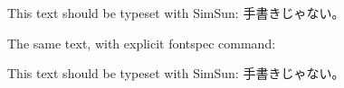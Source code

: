 \documentclass{article}
\begin{document}
This text should be typeset with SimSun: 手書きじゃない。

The same text, with explicit fontspec command:

This text should be typeset with SimSun: { 手書きじゃない。}
\end{document}

